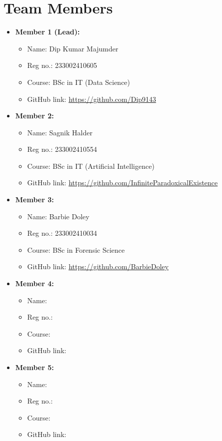\documentclass[a4paper,12pt]{article}
\begin{document}
\section*{Team Members}
\begin{itemize}
    \item \textbf{Member 1 (Lead):} 
    \begin{itemize}
        \item Name: Dip Kumar Majumder
        \item Reg no.: 233002410605
        \item Course: BSc in IT (Data Science)
        \item GitHub link: \url{https://github.com/Dip9143}
    \end{itemize}

    \item \textbf{Member 2:} 
    \begin{itemize}
        \item Name: Sagnik Halder
        \item Reg no.: 233002410554
        \item Course: BSc in IT (Artificial Intelligence)
        \item GitHub link: \url{https://github.com/InfiniteParadoxicalExistence}
    \end{itemize}

    \item \textbf{Member 3:} 
    \begin{itemize}
        \item Name: Barbie Doley
        \item Reg no.: 233002410034
        \item Course: BSc in Forensic Science
        \item GitHub link: \url{https://github.com/BarbieDoley}
    \end{itemize}

    \item \textbf{Member 4:} 
    \begin{itemize}
        \item Name: 
        \item Reg no.: 
        \item Course: 
        \item GitHub link: \url{}
    \end{itemize}

    \item \textbf{Member 5:} 
    \begin{itemize}
        \item Name: 
        \item Reg no.: 
        \item Course: 
        \item GitHub link: \url{}
    \end{itemize}
\end{itemize}
\end{document}
